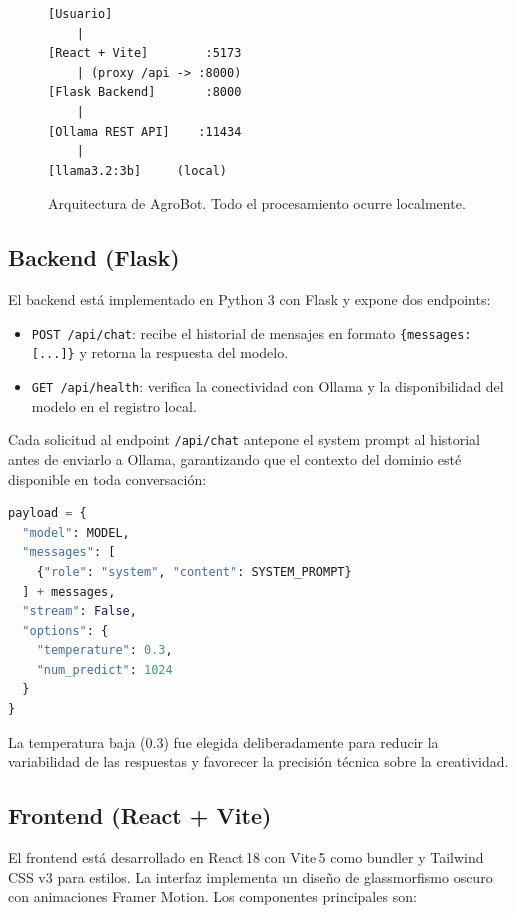\documentclass{IEEEtran}
\begin{document}
\begin{figure}[H]
\centering
\begin{minipage}{0.46\textwidth}
\small
\begin{verbatim}
[Usuario]
    |
[React + Vite]        :5173
    | (proxy /api -> :8000)
[Flask Backend]       :8000
    |
[Ollama REST API]    :11434
    |
[llama3.2:3b]     (local)
\end{verbatim}
\end{minipage}
\caption{Arquitectura de AgroBot. Todo el procesamiento ocurre localmente.}
\label{fig:arquitectura}
\end{figure}

\subsection{Backend (Flask)}

El backend está implementado en Python 3 con Flask y expone dos endpoints:

\begin{itemize}
  \item \texttt{POST /api/chat}: recibe el historial de mensajes en formato
    \texttt{\{messages: [...]\}} y retorna la respuesta del modelo.
  \item \texttt{GET /api/health}: verifica la conectividad con Ollama y la
    disponibilidad del modelo en el registro local.
\end{itemize}

Cada solicitud al endpoint \texttt{/api/chat} antepone el system prompt
al historial antes de enviarlo a Ollama, garantizando que el contexto
del dominio esté disponible en toda conversación:

\begin{lstlisting}[language=Python]
payload = {
  "model": MODEL,
  "messages": [
    {"role": "system", "content": SYSTEM_PROMPT}
  ] + messages,
  "stream": False,
  "options": {
    "temperature": 0.3,
    "num_predict": 1024
  }
}
\end{lstlisting}

La temperatura baja (0.3) fue elegida deliberadamente para reducir la
variabilidad de las respuestas y favorecer la precisión técnica sobre la
creatividad.

\subsection{Frontend (React + Vite)}

El frontend está desarrollado en React\,18 con Vite\,5 como bundler y
Tailwind CSS v3 para estilos. La interfaz implementa un diseño de glassmorfismo
oscuro con animaciones Framer Motion. Los componentes principales son:
\end{document}
